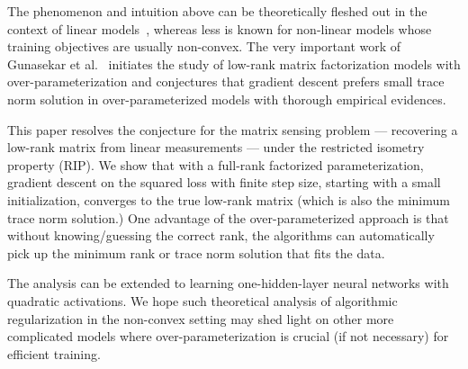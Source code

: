 The phenomenon and intuition above can be theoretically fleshed out in the context of linear models~\cite{soudry2017implicit}, whereas less is known for non-linear models whose training objectives are usually non-convex. The very important work of Gunasekar et al.~\cite{gunasekar2017implicit} initiates the study of low-rank matrix factorization models with over-parameterization and conjectures that gradient descent prefers small trace norm solution in over-parameterized models with thorough empirical evidences.

This paper resolves the conjecture for the matrix sensing problem --- recovering a low-rank matrix from linear measurements --- under the restricted isometry property (RIP). We show that with a full-rank factorized parameterization, gradient descent on the squared loss with finite step size, starting with a small initialization, converges to the true low-rank matrix (which is also the minimum trace norm solution.) One advantage of the over-parameterized approach is that without knowing/guessing the correct rank,  the algorithms can automatically pick up the minimum rank or trace norm solution that fits the data. 

The analysis can be extended to learning one-hidden-layer neural networks with quadratic activations. We hope such theoretical analysis of algorithmic regularization in the non-convex setting may shed light on other more complicated models where over-parameterization is crucial (if not necessary) for efficient training. 




